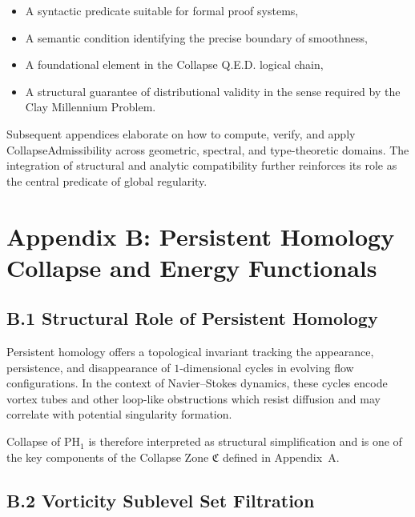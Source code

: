 \documentclass[11pt]{article}
\begin{document}
\begin{itemize}
  \item A syntactic predicate suitable for formal proof systems,
  \item A semantic condition identifying the precise boundary of smoothness,
  \item A foundational element in the Collapse Q.E.D. logical chain,
  \item A structural guarantee of distributional validity in the sense required by the Clay Millennium Problem.
\end{itemize}

Subsequent appendices elaborate on how to compute, verify, and apply CollapseAdmissibility across geometric, spectral, and type-theoretic domains. The integration of structural and analytic compatibility further reinforces its role as the central predicate of global regularity.




\appendix
\section*{Appendix B: \texorpdfstring{Persistent Homology Collapse and Energy Functionals}{Persistent Homology Collapse and Energy Functionals}}

\subsection{B.1 Structural Role of Persistent Homology}

Persistent homology offers a topological invariant tracking the appearance, persistence, and disappearance of $1$-dimensional cycles in evolving flow configurations. In the context of Navier--Stokes dynamics, these cycles encode vortex tubes and other loop-like obstructions which resist diffusion and may correlate with potential singularity formation.

Collapse of $\mathrm{PH}_1$ is therefore interpreted as structural simplification and is one of the key components of the Collapse Zone $\mathfrak{C}$ defined in Appendix~A.

\subsection{B.2 Vorticity Sublevel Set Filtration}
\end{document}
